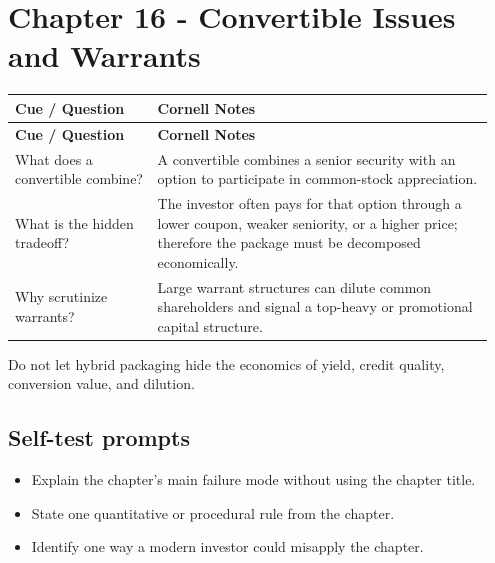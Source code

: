\documentclass[11pt]{article}
\begin{document}
\section{Chapter 16 - Convertible Issues and Warrants}
\begin{longtable}{@{}>{\raggedright\arraybackslash}p{0.29\linewidth}>{\raggedright\arraybackslash}p{0.66\linewidth}@{}}\toprule\textbf{Cue / Question} & \textbf{Cornell Notes}\\\midrule\endfirsthead\toprule\textbf{Cue / Question} & \textbf{Cornell Notes}\\\midrule\endhead
What does a convertible combine? & A convertible combines a senior security with an option to participate in common-stock appreciation. \\
What is the hidden tradeoff? & The investor often pays for that option through a lower coupon, weaker seniority, or a higher price; therefore the package must be decomposed economically. \\
Why scrutinize warrants? & Large warrant structures can dilute common shareholders and signal a top-heavy or promotional capital structure. \\
\bottomrule\end{longtable}
\begin{principlebox}Do not let hybrid packaging hide the economics of yield, credit quality, conversion value, and dilution.\end{principlebox}
\subsection*{Self-test prompts}\begin{itemize}\item Explain the chapter's main failure mode without using the chapter title.\item State one quantitative or procedural rule from the chapter.\item Identify one way a modern investor could misapply the chapter.\end{itemize}
\end{document}
